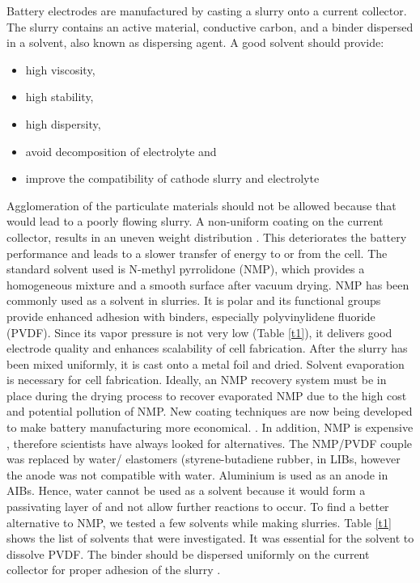 Battery electrodes are manufactured by casting a slurry onto a current collector. The slurry contains an active material, conductive carbon, and a binder dispersed in a solvent, also known as dispersing agent. A good solvent should provide:
\begin{itemize}
    \item high viscosity,
    \item high stability,
    \item high dispersity,
    \item avoid decomposition of electrolyte and 
    \item improve the compatibility of cathode slurry and electrolyte
\end{itemize}
Agglomeration of the particulate materials should not be allowed because that would lead to a poorly flowing slurry. A non-uniform coating on the current collector, results in an uneven weight distribution \cite{ludwig_solvent-free_2016}. This deteriorates the battery performance and leads to a slower transfer of energy to or from the cell. The standard solvent used is N-methyl pyrrolidone (NMP), which provides a homogeneous mixture and a smooth surface after vacuum drying. NMP has been commonly used as a solvent in slurries. It is polar and its functional groups provide enhanced adhesion with binders, especially polyvinylidene fluoride (PVDF). Since its vapor pressure is not very low (Table \ref{t1}), it delivers good electrode quality and enhances scalability of cell fabrication. After the slurry has been mixed uniformly, it is cast onto a metal foil and dried. Solvent evaporation is necessary for cell fabrication. Ideally, an NMP recovery system must be in place during the drying process to recover evaporated NMP due to the high cost and potential pollution of NMP. New coating techniques are now being developed to make battery manufacturing more economical. \cite{liu_effective_2014-1,spreafico_pvdf_2014-1, liu_effects_2008-1, lee_effect_2010-1, wenzel_challenges_2015}. In addition, NMP is expensive , therefore scientists have always looked for alternatives. The NMP/PVDF couple was replaced by water/ elastomers (styrene-butadiene rubber, \cite{lee_novel_2007, li_effects_2005} in LIBs, however the anode was not compatible with water. Aluminium is used as an anode in AIBs. Hence, water cannot be used as a solvent because it would form a passivating layer of  and not allow further reactions to occur. 
To find a better alternative to NMP, we tested a few solvents while making slurries. Table \ref{t1} shows the list of solvents that were investigated. It was essential for the solvent to dissolve PVDF. The binder should be dispersed uniformly on the current collector for proper adhesion of the slurry \cite{lee_selection_2017, stein_non-aqueous_2016}. 

